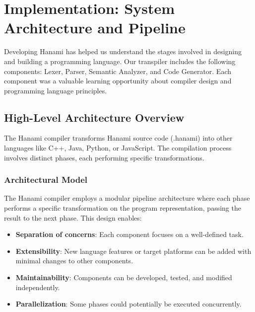 \documentclass[conference]{IEEEtran}
\begin{document}
\section{Implementation: System Architecture and Pipeline}
\label{sec:implementation}

Developing Hanami has helped us understand the stages involved in designing and building a programming language. Our transpiler includes the following components: Lexer, Parser, Semantic Analyzer, and Code Generator. Each component was a valuable learning opportunity about compiler design and programming language principles.



\subsection{High-Level Architecture Overview}

The Hanami compiler transforms Hanami source code (.hanami) into other languages like C++, Java, Python, or JavaScript. The compilation process involves distinct phases, each performing specific transformations.

\subsubsection{Architectural Model}

The Hanami compiler employs a modular pipeline architecture where each phase performs a specific transformation on the program representation, passing the result to the next phase. This design enables:

\begin{itemize}
    \item \textbf{Separation of concerns}: Each component focuses on a well-defined task.
    \item \textbf{Extensibility}: New language features or target platforms can be added with minimal changes to other components.
    \item \textbf{Maintainability}: Components can be developed, tested, and modified independently.
    \item \textbf{Parallelization}: Some phases could potentially be executed concurrently. %
\end{itemize}
\end{document}
